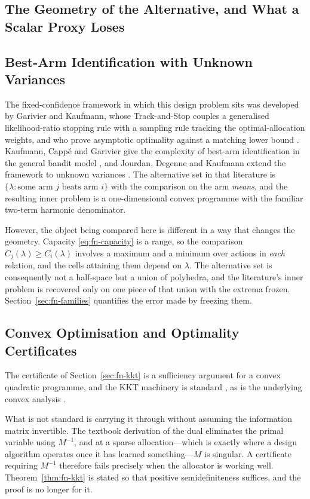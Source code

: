 \documentclass[conference]{IEEEtran}
\theoremstyle{definition}
\begin{document}
\subsection{The Geometry of the Alternative, and What a Scalar Proxy Loses}

\subsection{Best-Arm Identification with Unknown Variances}

The fixed-confidence framework in which this design problem sits was developed by Garivier
and Kaufmann, whose Track-and-Stop couples a generalised likelihood-ratio stopping rule with
a sampling rule tracking the optimal-allocation weights, and who prove asymptotic optimality
against a matching lower bound \cite{garivier2016}. Kaufmann, Capp\'e and Garivier give the
complexity of best-arm identification in the general bandit model \cite{kaufmann2016}, and
Jourdan, Degenne and Kaufmann extend the framework to unknown variances \cite{jourdan2023}.
The alternative set in that literature is $\{\lambda:\text{some arm }j\text{ beats arm }i\}$
with the comparison on the arm \emph{means}, and the resulting inner problem is a
one-dimensional convex programme with the familiar two-term harmonic denominator.

However, the object being compared here is different in a way that changes the geometry.
Capacity \eqref{eq:fn-capacity} is a range, so the comparison $C_{j}(\lambda)\ge C_{i}(\lambda)$
involves a maximum and a minimum over actions in \emph{each} relation, and the cells
attaining them depend on $\lambda$. The alternative set is consequently not a half-space but
a union of polyhedra, and the literature's inner problem is recovered only on one piece of
that union with the extrema frozen. Section~\ref{sec:fn-families} quantifies the error made by
freezing them.

\subsection{Convex Optimisation and Optimality Certificates}

The certificate of Section~\ref{sec:fn-kkt} is a sufficiency argument for a convex quadratic
programme, and the KKT machinery is standard \cite{boyd2004}, as is the underlying convex
analysis \cite{rockafellar1970}.

What is not standard is carrying it through without assuming the information matrix
invertible. The textbook derivation of the dual eliminates the primal variable using
$M^{-1}$, and at a sparse allocation---which is exactly where a design algorithm operates
once it has learned something---$M$ is singular. A certificate requiring $M^{-1}$ therefore
fails precisely when the allocator is working well. Theorem~\ref{thm:fn-kkt} is stated so that
positive semidefiniteness suffices, and the proof is no longer for it.
\end{document}
